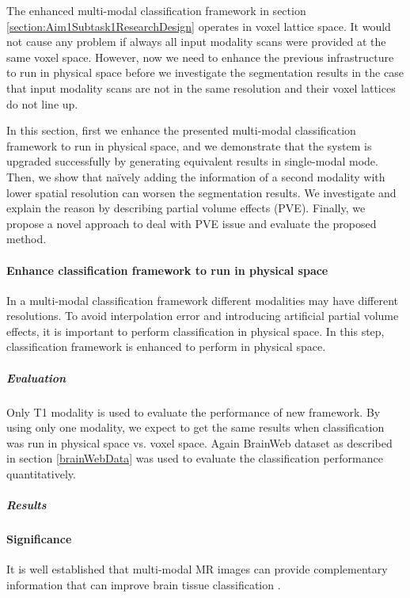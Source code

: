 The enhanced multi-modal classification framework in section \ref{section:Aim1Subtask1ResearchDesign} operates in voxel lattice space. It would not cause any problem if always all input modality scans were provided at the same voxel space. However, now we need to enhance the previous infrastructure to run in physical space before we investigate the segmentation results in the case that input modality scans are not in the same resolution and their voxel lattices do not line up.

In this section, first we enhance the presented multi-modal classification framework to run in physical space, and we demonstrate that the system is upgraded successfully by generating equivalent results in single-modal mode. 
Then, we show that na\"{i}vely adding the information of a second modality with lower spatial resolution can worsen the segmentation results. We investigate and explain the reason by describing partial volume effects (PVE). Finally, we propose a novel approach to deal with PVE issue and evaluate the proposed method.

\paragraph{Enhance classification framework to run in physical space} %

In a multi-modal classification framework different modalities may have different resolutions. To avoid interpolation error and introducing artificial partial volume effects, it is important to perform classification in physical space. In this step, classification framework is enhanced to perform in physical space.

\subparagraph{Evaluation}
Only T1 modality is used to evaluate the performance of new framework. By using only one modality, we expect to get the same results when classification was run in physical space vs. voxel space. Again BrainWeb dataset as described in section \ref{brainWebData} was used to evaluate the classification performance quantitatively.

\subparagraph{Results}






\paragraph{Significance}

It is well established that multi-modal MR images can provide complementary information that can improve brain tissue classification \cite{Kim2013}.

